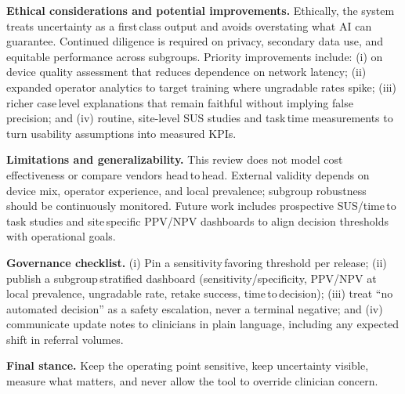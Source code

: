 \documentclass[sigplan,screen]{acmart}
\begin{document}
\textbf{Ethical considerations and potential improvements.} Ethically, the system treats uncertainty as a first\,class output and avoids overstating what AI can guarantee. Continued diligence is required on privacy, secondary data use, and equitable performance across subgroups. Priority improvements include: (i) on\,device quality assessment that reduces dependence on network latency; (ii) expanded operator analytics to target training where ungradable rates spike; (iii) richer case\,level explanations that remain faithful without implying false precision; and (iv) routine, site-level SUS studies and task\,time measurements to turn usability assumptions into measured KPIs.

\textbf{Limitations and generalizability.} This review does not model cost\,effectiveness or compare vendors head\,to\,head. External validity depends on device mix, operator experience, and local prevalence; subgroup robustness should be continuously monitored. Future work includes prospective SUS/time\,to\,task studies and site\,specific PPV/NPV dashboards to align decision thresholds with operational goals.

\textbf{Governance checklist.} (i) Pin a sensitivity\,favoring threshold per release; (ii) publish a subgroup\,stratified dashboard (sensitivity/specificity, PPV/NPV at local prevalence, ungradable rate, retake success, time\,to\,decision); (iii) treat ``no automated decision'' as a safety escalation, never a terminal negative; and (iv) communicate update notes to clinicians in plain language, including any expected shift in referral volumes.

\textbf{Final stance.} Keep the operating point sensitive, keep uncertainty visible, measure what matters, and never allow the tool to override clinician concern.



\end{document}
